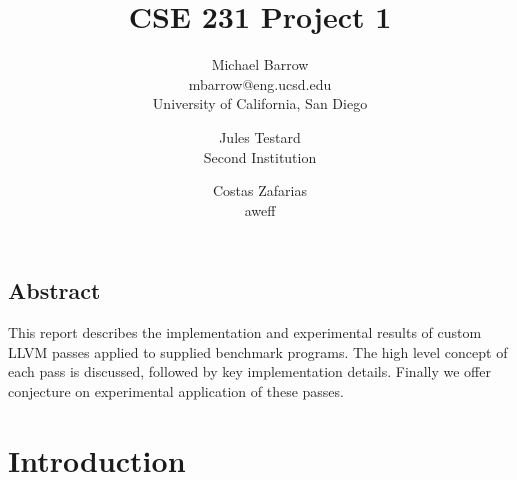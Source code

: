 \documentclass[letterpaper,twocolumn,10pt]{article}
\begin{document}
\date{}

\title{\Large \bf CSE 231 Project 1}

\author{
{\rm Michael Barrow}\\
mbarrow@eng.ucsd.edu\\
University of California, San Diego
\and
{\rm Jules Testard}\\
Second Institution
\and
{Costas Zafarias}\\
aweff
}

\maketitle

\thispagestyle{empty}


\subsection*{Abstract}
This report describes the implementation and experimental results of custom LLVM passes applied to supplied benchmark programs. The high level concept of each pass is discussed, followed by key implementation details. Finally we offer conjecture on experimental application of these passes. %

\section{Introduction}
\end{document}
